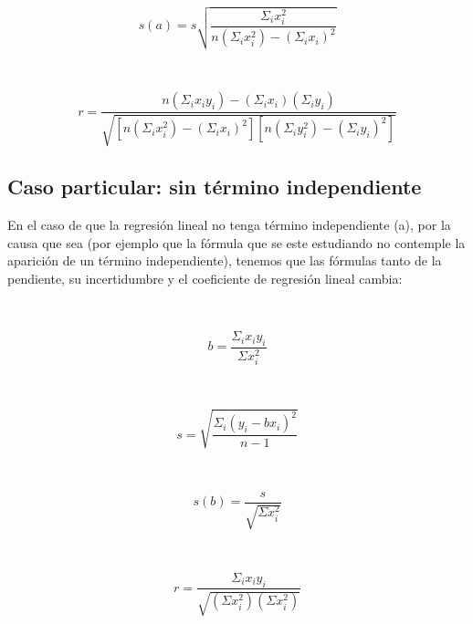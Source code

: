 \documentclass[12pt,a4paper]{book}
\begin{document}
$ $

\begin{equation}
s(a)=s \sqrt{\dfrac{\Sigma_i x_i^2}{n(\Sigma_i x_i^2)-(\Sigma_i x_i)^2} }
\label{Ec: ecuación incertidumbre de a regresión lineal simple}
\end{equation}

$ $

\begin{equation}
r = \dfrac{n (\Sigma_i x_i y_i) - (\Sigma_i x_i)(\Sigma_i y_i)}{\sqrt{[n(\Sigma_i x_i^2)-(\Sigma_i x_i)^2][n(\Sigma_i y_i^2)-(\Sigma_i y_i)^2]}}\label{Ec: coeficiente de regresión lineal simple}
\end{equation}

\subsection{Caso particular: sin término independiente}\label{Sub:regresión-sin-termino-independiente}

En el caso de que la regresión lineal no tenga término independiente (a), por la causa que sea (por ejemplo que la fórmula que se este estudiando no contemple la aparición de un término independiente), tenemos que las fórmulas tanto de la pendiente, su incertidumbre y el coeficiente de regresión lineal cambia:


$ $

\begin{equation}
b=\dfrac{\Sigma_i x_i y_i}{\Sigma x_i^2}
\label{Ec: ecuación de b regresión lineal simple sin término independiente}
\end{equation}

$ $

\begin{equation}
s=\sqrt{\dfrac{\Sigma_i (y_i-bx_i)^2}{n-1}}
\label{Ec: ecuación de la desviación típica del ajuste regresión lineal simple sin término independiente}
\end{equation}

$ $

\begin{equation}
s(b)=\dfrac{s}{\sqrt{\Sigma x_i^2}}
\label{Ec: ecuación de b regresión lineal simple sin término independiente}
\end{equation}

$ $

\begin{equation}
r=\dfrac{\Sigma_i x_i y_i}{\sqrt{(\Sigma x_i^2)(\Sigma x_i^2)}}
\label{Ec: ecuación de b regresión lineal simple sin término independiente}
\end{equation}
\end{document}

